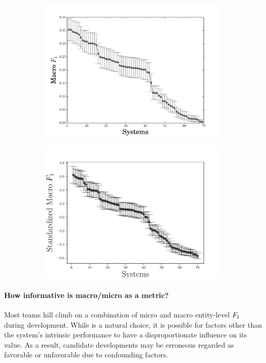 \begin{figure}
  \begin{subfigure}{0.49\textwidth}
  \includegraphics[width=\columnwidth]{figures/experiment1}
  \end{subfigure}
  \begin{subfigure}{0.49\textwidth}
  \includegraphics[width=\columnwidth]{figures/experiment3}
  \end{subfigure}
  \caption{}
\end{figure}

\paragraph{How informative is macro/micro \fone{} as a metric?}
Most teams hill climb on a combination of micro and macro entity-level $F_1$ during development.
While \fone{} is a natural choice, it is possible for factors other than the system's intrinsic performance to have a disproportionate influence on its value.  
As a result, candidate developments may be erroneous regarded as favorable or unfavorable due to confounding factors. 


